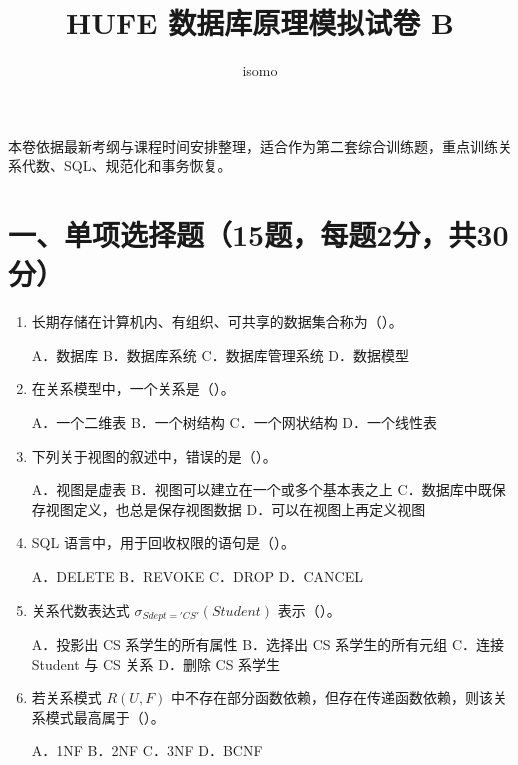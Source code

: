 \documentclass{../../note}
\title{HUFE 数据库原理模拟试卷 B}
\author{isomo}
\begin{document}
\fontsize{12pt}{14.4pt}\selectfont
\maketitle

本卷依据最新考纲与课程时间安排整理，适合作为第二套综合训练题，重点训练关系代数、SQL、规范化和事务恢复。

\section*{一、单项选择题（15题，每题2分，共30分）}

\begin{enumerate}[itemsep=0.8em]
\item 长期存储在计算机内、有组织、可共享的数据集合称为（\hspace{0.8cm}）。

A．数据库 \quad B．数据库系统 \quad C．数据库管理系统 \quad D．数据模型

\item 在关系模型中，一个关系是（\hspace{0.8cm}）。

A．一个二维表 \quad B．一个树结构 \quad C．一个网状结构 \quad D．一个线性表

\item 下列关于视图的叙述中，错误的是（\hspace{0.8cm}）。

A．视图是虚表
\quad B．视图可以建立在一个或多个基本表之上
\quad C．数据库中既保存视图定义，也总是保存视图数据
\quad D．可以在视图上再定义视图

\item SQL 语言中，用于回收权限的语句是（\hspace{0.8cm}）。

A．DELETE \quad B．REVOKE \quad C．DROP \quad D．CANCEL

\item 关系代数表达式 $\sigma_{Sdept='CS'}(Student)$ 表示（\hspace{0.8cm}）。

A．投影出 CS 系学生的所有属性
\quad B．选择出 CS 系学生的所有元组
\quad C．连接 Student 与 CS 关系
\quad D．删除 CS 系学生

\item 若关系模式 $R(U,F)$ 中不存在部分函数依赖，但存在传递函数依赖，则该关系模式最高属于（\hspace{0.8cm}）。

A．1NF \quad B．2NF \quad C．3NF \quad D．BCNF


\end{enumerate}
\end{document}

